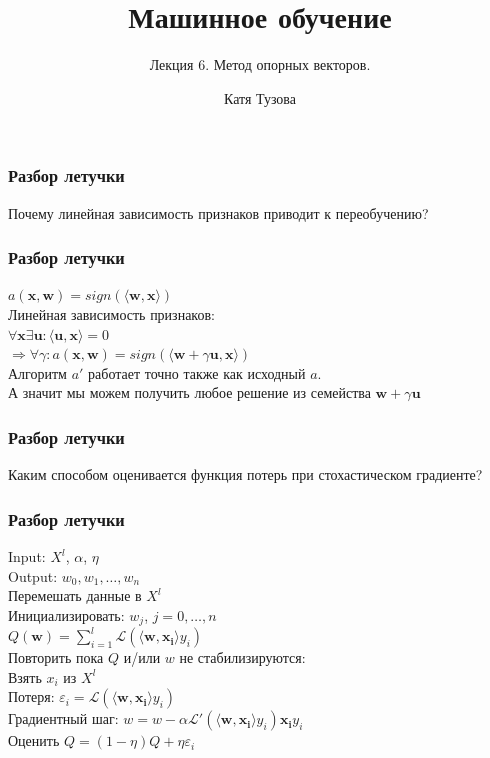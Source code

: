 \documentclass[12pt]{beamer}
\author{Катя Тузова}
\title{Машинное обучение}
\subtitle{Лекция 6. Метод опорных векторов.}
\date{}
\begin{document}
	
\frame{\titlepage}

\begin{frame}\frametitle{Разбор летучки}
Почему линейная зависимость признаков приводит к переобучению?
\end{frame}

\begin{frame}\frametitle{Разбор летучки}
$a(\mathbf{x}, \mathbf{w}) = sign(\langle \mathbf{w}, \mathbf{x}\rangle)$\\
Линейная зависимость признаков:\\
$\forall \mathbf{x} \exists \mathbf{u}: \langle \mathbf{u}, \mathbf{x}\rangle = 0$\\
$\Rightarrow \forall \gamma: a(\mathbf{x}, \mathbf{w}) = sign(\langle \mathbf{w} + \gamma \mathbf{u}, \mathbf{x}\rangle)$\\
\vspace{5mm}
Алгоритм $a'$ работает точно также как исходный $a$.\\
А значит мы можем получить любое решение из семейства $\mathbf{w} + \gamma \mathbf{u}$
\end{frame}

\begin{frame}\frametitle{Разбор летучки}
Каким способом оценивается функция потерь при стохастическом градиенте?
\end{frame}

\begin{frame}\frametitle{Разбор летучки}
Input: $X^l$, $\alpha$, $\eta$\\
Output: $w_0, w_1, \dots, w_n$\\
\vspace{3mm}
Перемешать данные в $X^l$\\
Инициализировать: $w_j$, $j=0,\dots, n$\\
\hspace{35mm} ${Q}(\mathbf{w}) = \sum\limits_{i=1}^l \mathcal{L}(\langle \mathbf{w}, \mathbf{x_i} \rangle y_i)$\\
Повторить пока $Q$ и/или $w$ не стабилизируются:\\
\hspace{5mm} Взять $x_i$ из $X^l$\\
\hspace{5mm} Потеря: $\varepsilon_i = \mathcal{L}(\langle \mathbf{w}, \mathbf{x_i} \rangle y_i)$\\
\hspace{5mm} Градиентный шаг: $w =  w - \alpha \mathcal{L}'(\langle \mathbf{w}, \mathbf{x_i}\rangle y_i)\mathbf{x_i}y_i$\\
\hspace{5mm} Оценить $Q = (1-\eta)Q + \eta \varepsilon_i$
\end{frame}
\end{document}
